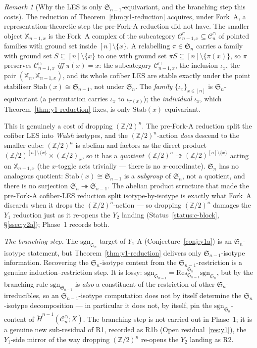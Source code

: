 \documentclass[11pt,oneside]{amsart}
\theoremstyle{plain}
\theoremstyle{definition}
\theoremstyle{remark}
\newtheorem{remark}[theorem]{Remark}
\theoremstyle{honeststyle}
\newcommand{\sgn}{\mathrm{sgn}}
\newcommand{\Sym}{\mathfrak{S}}
\newcommand{\Z}{\mathbb{Z}}
\newcommand{\Cn}{\mathcal{C}^{\cap}_n}
\newcommand{\Cnm}{\mathcal{C}^{\cap}_{n-1,x}}
\newcommand{\Xbb}{\mathbb{X}}
\begin{document}
\begin{remark}[Why the LES is only $\Sym_{n-1}$-equivariant, and the
branching step this costs]
\label{rem:y1-branching}
The reduction of Theorem~\ref{thm:y1-reduction} acquires, under
Fork~A, a representation-theoretic step the pre-Fork-A reduction did
not have. The smaller object $\Xbb_{n-1,x}$ is the Fork~A complex of
the subcategory $\Cnm\subseteq\Cn$ of pointed families with ground set
inside $[n]\setminus\{x\}$. A relabelling $\pi\in\Sym_n$ carries a
family with ground set $S\subseteq[n]\setminus\{x\}$ to one with
ground set $\pi S\subseteq[n]\setminus\{\pi(x)\}$, so $\pi$ preserves
$\Cnm$ \emph{iff} $\pi(x)=x$: the subcategory $\Cnm$, the inclusion
$\iota_x$, the pair $(\Xbb_n,\Xbb_{n-1,x})$, and its whole cofiber LES
are stable exactly under the point stabiliser
$\mathrm{Stab}(x)\cong\Sym_{n-1}$, not under $\Sym_n$. The
\emph{family} $\{\iota_x\}_{x\in[n]}$ is $\Sym_n$-equivariant (a
permutation carries $\iota_x$ to $\iota_{\pi(x)}$); the
\emph{individual} $\iota_x$, which Theorem~\ref{thm:y1-reduction}
fixes, is only $\mathrm{Stab}(x)$-equivariant.

This is genuinely a cost of dropping $(\Z/2)^n$. The pre-Fork-A
reduction split the cofiber LES into \emph{Walsh} isotypes, and the
$(\Z/2)^n$-action \emph{does} descend to the smaller cube: $(\Z/2)^n$
is abelian and factors as the direct product
$(\Z/2)^{[n]\setminus\{x\}}\times(\Z/2)_x$, so it has a
\emph{quotient} $(\Z/2)^n\twoheadrightarrow(\Z/2)^{[n]\setminus\{x\}}$
acting on $\Xbb_{n-1,x}$ (the $x$-toggle acts trivially --- there is
no $x$-coordinate). $\Sym_n$ has no analogous quotient:
$\mathrm{Stab}(x)\cong\Sym_{n-1}$ is a \emph{subgroup} of $\Sym_n$,
not a quotient, and there is no surjection
$\Sym_n\twoheadrightarrow\Sym_{n-1}$. The abelian product structure
that made the pre-Fork-A cofiber-LES reduction split
isotype-by-isotype is exactly what Fork~A discards when it drops the
$(\Z/2)^n$-action --- so dropping $(\Z/2)^n$ damages the $Y_1$
reduction just as it re-opens the $Y_2$ landing
(Status~\ref{status:c-block}, \S\ref{ssec:y2a}); Phase~1 records both.

\smallskip\noindent\emph{The branching step.} The $\sgn_{\Sym_n}$
target of $Y_1$-A (Conjecture~\ref{conj:y1a}) is an
$\Sym_n$-isotype statement, but Theorem~\ref{thm:y1-reduction}
delivers only $\Sym_{n-1}$-isotype information. Recovering the
$\Sym_n$-isotype content from the $\Sym_{n-1}$-restriction is a
genuine induction--restriction step. It is lossy:
$\sgn_{\Sym_{n-1}}=\mathrm{Res}^{\Sym_n}_{\Sym_{n-1}}\sgn_{\Sym_n}$,
but by the branching rule $\sgn_{\Sym_{n-1}}$ is \emph{also} a
constituent of the restriction of other $\Sym_n$-irreducibles, so an
$\Sym_{n-1}$-isotype computation does not by itself determine the
$\Sym_n$-isotype decomposition --- in particular it does not, by
itself, pin the $\sgn_{\Sym_n}$-content of $\widetilde
H^{n-1}(\Cn;X)$. The branching step is not carried out in Phase~1; it
is a genuine new sub-residual of R1, recorded as R1b (Open
residual~\ref{res:y1}), the $Y_1$-side mirror of the way dropping
$(\Z/2)^n$ re-opens the $Y_2$ landing as R2.
\end{remark}
\end{document}
